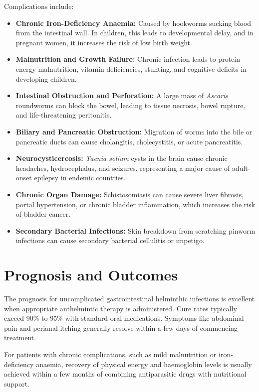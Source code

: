 Complications include:
\begin{itemize}
    \item \textbf{Chronic Iron-Deficiency Anaemia:} Caused by hookworms sucking blood from the intestinal wall. In children, this leads to developmental delay, and in pregnant women, it increases the risk of low birth weight.
    \item \textbf{Malnutrition and Growth Failure:} Chronic infection leads to protein-energy malnutrition, vitamin deficiencies, stunting, and cognitive deficits in developing children.
    \item \textbf{Intestinal Obstruction and Perforation:} A large mass of \textit{Ascaris} roundworms can block the bowel, leading to tissue necrosis, bowel rupture, and life-threatening peritonitis.
    \item \textbf{Biliary and Pancreatic Obstruction:} Migration of worms into the bile or pancreatic ducts can cause cholangitis, cholecystitis, or acute pancreatitis.
    \item \textbf{Neurocysticercosis:} \textit{Taenia solium} cysts in the brain cause chronic headaches, hydrocephalus, and seizures, representing a major cause of adult-onset epilepsy in endemic countries.
    \item \textbf{Chronic Organ Damage:} Schistosomiasis can cause severe liver fibrosis, portal hypertension, or chronic bladder inflammation, which increases the risk of bladder cancer.
    \item \textbf{Secondary Bacterial Infections:} Skin breakdown from scratching pinworm infections can cause secondary bacterial cellulitis or impetigo.
\end{itemize}

\section*{Prognosis and Outcomes}
The prognosis for uncomplicated gastrointestinal helminthic infections is excellent when appropriate anthelmintic therapy is administered. Cure rates typically exceed 90\% to 95\% with standard oral medications. Symptoms like abdominal pain and perianal itching generally resolve within a few days of commencing treatment.

For patients with chronic complications, such as mild malnutrition or iron-deficiency anaemia, recovery of physical energy and haemoglobin levels is usually achieved within a few months of combining antiparasitic drugs with nutritional support.

